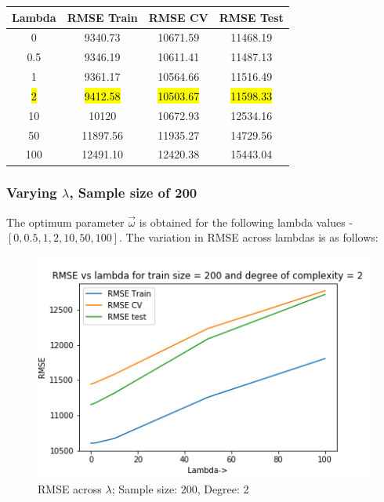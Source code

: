 \documentclass[12pt,a4paper]{article}
\begin{document}
 
\begin{center}
\begin{tabular}{c c c c} 
\hline
\hline
\textbf{Lambda} & \textbf{RMSE Train} & \textbf{RMSE CV} & \textbf{RMSE Test} \\
\hline
\hline
0 & 9340.73 & 10671.59 & 11468.19 \\ 
0.5 & 9346.19 & 10611.41 & 11487.13 \\
1 & 9361.17 & 10564.66 & 11516.49 \\
\hl{2} & \hl{9412.58} & \hl{10503.67} & \hl{11598.33} \\
10 & 10120 & 10672.93 & 12534.16 \\
50 & 11897.56 & 11935.27 & 14729.56  \\ 
100 & 12491.10 & 12420.38 & 15443.04 \\ 
\hline
\end{tabular}
\label{d250}
\end{center}
\subsubsection{Varying $\lambda$, Sample size of 200}
 
 The optimum parameter \textbf{$\vec{\omega}$} is obtained for the following lambda values - $[0, 0.5, 1, 2, 10, 50, 100]$. The variation in RMSE across lambdas is as follows: \\
 
\begin{figure}[H]
     \centering
     \includegraphics[scale=0.7]{images/d2_200.png}
     \caption{RMSE across $\lambda$; Sample size: 200, Degree: 2}
\end{figure}
 
\end{document}
